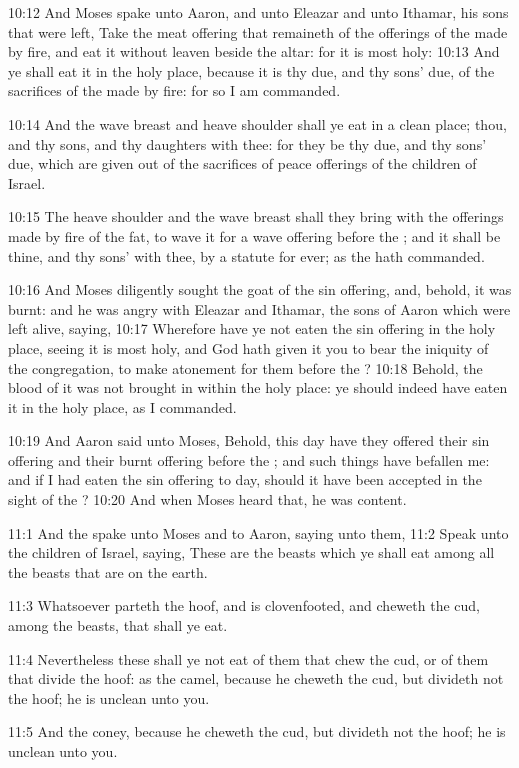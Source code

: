10:12 And Moses spake unto Aaron, and unto Eleazar and unto Ithamar, his sons that were left, Take the meat offering that remaineth of the offerings of the \LORD made by fire, and eat it without leaven beside the altar: for it is most holy: 10:13 And ye shall eat it in the holy place, because it is thy due, and thy sons' due, of the sacrifices of the \LORD made by fire: for so I am commanded.

10:14 And the wave breast and heave shoulder shall ye eat in a clean place; thou, and thy sons, and thy daughters with thee: for they be thy due, and thy sons' due, which are given out of the sacrifices of peace offerings of the children of Israel.

10:15 The heave shoulder and the wave breast shall they bring with the offerings made by fire of the fat, to wave it for a wave offering before the \LORD; and it shall be thine, and thy sons' with thee, by a statute for ever; as the \LORD hath commanded.

10:16 And Moses diligently sought the goat of the sin offering, and, behold, it was burnt: and he was angry with Eleazar and Ithamar, the sons of Aaron which were left alive, saying, 10:17 Wherefore have ye not eaten the sin offering in the holy place, seeing it is most holy, and God hath given it you to bear the iniquity of the congregation, to make atonement for them before the \LORD?  10:18 Behold, the blood of it was not brought in within the holy place: ye should indeed have eaten it in the holy place, as I commanded.

10:19 And Aaron said unto Moses, Behold, this day have they offered their sin offering and their burnt offering before the \LORD; and such things have befallen me: and if I had eaten the sin offering to day, should it have been accepted in the sight of the \LORD?  10:20 And when Moses heard that, he was content.

11:1 And the \LORD spake unto Moses and to Aaron, saying unto them, 11:2 Speak unto the children of Israel, saying, These are the beasts which ye shall eat among all the beasts that are on the earth.

11:3 Whatsoever parteth the hoof, and is clovenfooted, and cheweth the cud, among the beasts, that shall ye eat.

11:4 Nevertheless these shall ye not eat of them that chew the cud, or of them that divide the hoof: as the camel, because he cheweth the cud, but divideth not the hoof; he is unclean unto you.

11:5 And the coney, because he cheweth the cud, but divideth not the hoof; he is unclean unto you.

